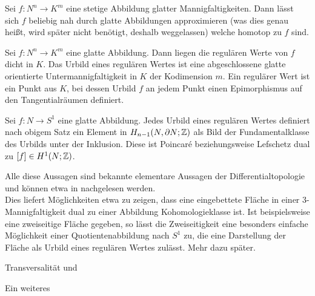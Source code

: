 \begin{bem}
\begin{thm}
		Sei $f:N^n\to K^m$ eine stetige Abbildung glatter Mannigfaltigkeiten. Dann lässt sich $f$ beliebig nah durch glatte Abbildungen approximieren (was dies genau heißt, wird später nicht benötigt, deshalb weggelassen) welche homotop zu $f$ sind.
	\end{thm}
	\begin{thm}
		Sei $f:N^n \to K^m$ eine glatte Abbildung. Dann liegen die regulären Werte von $f$ dicht in $K$. Das Urbild eines regulären Wertes ist eine abgeschlossene glatte orientierte Untermannigfaltigkeit in $K$ der Kodimension $m$. Ein regulärer Wert ist ein Punkt aus $K$, bei dessen Urbild $f$ an jedem Punkt einen Epimorphismus auf den Tangentialräumen definiert. 
	\end{thm}
	\begin{thm}
		Sei $f:N \to S^1$ eine glatte Abbildung. Jedes Urbild eines regulären Wertes definiert nach obigem Satz ein Element in $H_{n-1}(N,\partial N;\mathbb{Z})$ als Bild der Fundamentalklasse des Urbilds unter der Inklusion. Diese ist Poincaré beziehungsweise Lefschetz dual zu $[f]\in H^1(N;\mathbb{Z})$.
	\end{thm}
	Alle diese Aussagen sind bekannte elementare Aussagen der Differentialtopologie und können etwa in  nachgelesen werden. \\
	Dies liefert Möglichkeiten etwa zu zeigen, dass eine eingebettete Fläche in einer 3-Mannigfaltigkeit dual zu einer Abbildung Kohomologieklasse ist. Ist beispielsweise eine zweiseitige Fläche gegeben, so lässt die Zweiseitigkeit eine besonders einfache Möglichkeit einer Quotientenabbildung nach $S^1$ zu, die eine Darstellung der Fläche als Urbild eines regulären Wertes zulässt. Mehr dazu später.\\
	\end{bem}
	Transversalität und 
	\begin{bem}[Schnittzahlen]
		Ein weiteres 
	\end{bem}
